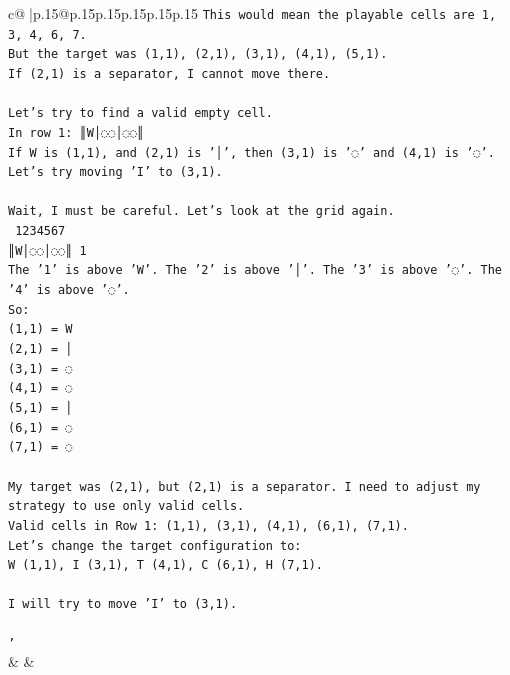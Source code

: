 \documentclass{article}
\begin{document}
{\begin{supertabular}{c@{$\;$}|p{.15\linewidth}@{}p{.15\linewidth}p{.15\linewidth}p{.15\linewidth}p{.15\linewidth}p{.15\linewidth}}
{{{\texttt{This would mean the playable cells are 1, 3, 4, 6, 7.} \\
\texttt{But the target was (1,1), (2,1), (3,1), (4,1), (5,1).} \\
\texttt{If (2,1) is a separator, I cannot move there.} \\
\\ 
\texttt{Let's try to find a valid empty cell.} \\
\texttt{In row 1: ║W│◌◌│◌◌║} \\
\texttt{If W is (1,1), and (2,1) is '│', then (3,1) is '◌' and (4,1) is '◌'.} \\
\texttt{Let's try moving 'I' to (3,1).} \\
\\ 
\texttt{Wait, I must be careful. Let's look at the grid again.} \\
\texttt{ 1234567} \\
\texttt{║W│◌◌│◌◌║ 1} \\
\texttt{The '1' is above 'W'. The '2' is above '│'. The '3' is above '◌'. The '4' is above '◌'.} \\
\texttt{So:} \\
\texttt{(1,1) = W} \\
\texttt{(2,1) = │} \\
\texttt{(3,1) = ◌} \\
\texttt{(4,1) = ◌} \\
\texttt{(5,1) = │} \\
\texttt{(6,1) = ◌} \\
\texttt{(7,1) = ◌} \\
\\ 
\texttt{My target was (2,1), but (2,1) is a separator. I need to adjust my strategy to use only valid cells.} \\
\texttt{Valid cells in Row 1: (1,1), (3,1), (4,1), (6,1), (7,1).} \\
\texttt{Let's change the target configuration to:} \\
\texttt{W (1,1), I (3,1), T (4,1), C (6,1), H (7,1).} \\
\\ 
\texttt{I will try to move 'I' to (3,1).} \\
\\ 
\texttt{'} \\
            }
        }
    }
    & & \\ \\


\end{supertabular}}
\end{document}
